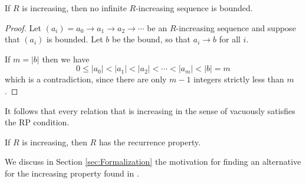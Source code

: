 \begin{proposition}
    If $R$ is increasing, then no infinite $R$-increasing sequence is bounded.
\end{proposition}
\begin{proof}
    Let $(a_i) = a_0 \to a_1 \to a_2 \to \cdots$ be an $R$-increasing sequence
    and suppose that $(a_i)$ is bounded.  Let $b$ be the bound, so that $a_i \to b$ for all $i$.

    If $m = |b|$ then we have
    \[ 0 \le |a_0| < |a_1| < |a_2| < \cdots < |a_m| < |b| = m \]
    which is a contradiction, since there are only $m-1$ integers strictly less than $m$.
\end{proof}
It follows that every relation that is increasing in the sense of \terese
vacuously satisfies the RP condition.

\begin{corollary}
    If $R$ is increasing, then $R$ has the recurrence property.
\end{corollary}
We discuss in Section \ref{sec:Formalization} the motivation for finding an alternative for the increasing property found in \terese. 

